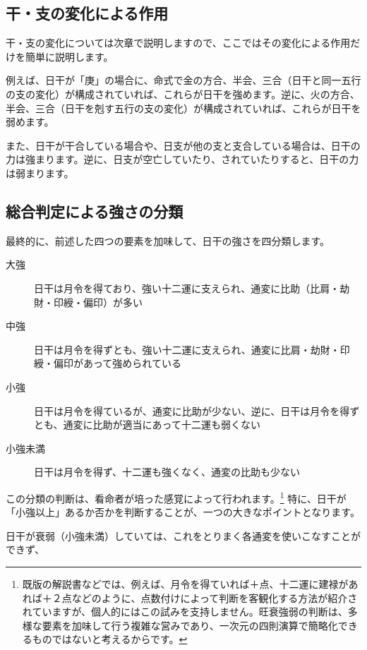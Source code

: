 \documentclass[a5paper,11pt,dvipdfmx]{tarticle}
\begin{document}
\subsection{干・支の変化による作用}

干・支の変化については次章で説明しますので、ここではその変化による作用だけを簡単に説明します。

例えば、日干が「庚」の場合に、命式で金の方合、半会、三合（日干と同一五行の支の変化）が構成されていれば、これらが日干を強めます。逆に、火の方合、半会、三合（日干を剋す五行の支の変化）が構成されていれば、これらが日干を弱めます。

また、日干が干合している場合や、日支が他の支と支合している場合は、日干の力は強まります。逆に、日支が空亡していたり、されていたりすると、日干の力は弱まります。

\subsection{総合判定による強さの分類}

最終的に、前述した四つの要素を加味して、日干の強さを四分類します。

\begin{description}
 \item[大強] 日干は月令を得ており、強い十二運に支えられ、通変に比助（比肩・劫財・印綬・偏印）が多い
 \item[中強] 日干は月令を得ずとも、強い十二運に支えられ、通変に比肩・劫財・印綬・偏印があって強められている
 \item[小強] 日干は月令を得ているが、通変に比助が少ない、逆に、日干は月令を得ずとも、通変に比助が適当にあって十二運も弱くない
 \item[小強未満] 日干は月令を得ず、十二運も強くなく、通変の比助も少ない
\end{description}

この分類の判断は、看命者が培った感覚によって行われます。\footnote{既版の解説書などでは、例えば、月令を得ていれば＋点、十二運に建禄があれば＋２点などのように、点数付けによって判断を客観化する方法が紹介されていますが、個人的にはこの試みを支持しません。旺衰強弱の判断は、多様な要素を加味して行う複雑な営みであり、一次元の四則演算で簡略化できるものではないと考えるからです。}
特に、日干が「小強以上」あるか否かを判断することが、一つの大きなポイントとなります。

日干が衰弱（小強未満）していては、これをとりまく各通変を使いこなすことができず、

\end{document}

